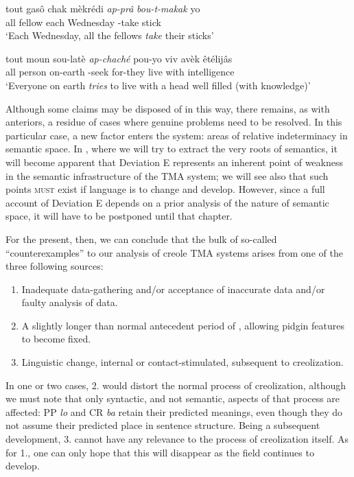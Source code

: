 \ea\label{ex:2:123}
 \gll tout gasô chak mèkrédi \emph{ap-prâ} \emph{bou-t-makak} yo\\
all fellow each Wednesday \ASP-take stick {\PL}\\
\glt `Each Wednesday, all the fellows \textit{take} their sticks'
\z

\ea\label{ex:2:124}
\gll tout moun sou-latè \emph{ap-chaché} pou-yo viv avèk êtélijâs\\
all person on-earth \ASP-seek for-they live with intelligence\\
\glt `Everyone on earth \textit{tries} to live with a head well filled (with knowledge)'
\z

Although some claims may be disposed of in this way, there remains, as with anteriors, a residue of cases where genuine problems need to be resolved. In this particular case, a new factor enters the system: areas of relative indeterminacy in semantic space. In , where we will try to extract the very roots of semantics, it will become apparent that Deviation E represents an inherent point of weakness in the semantic infrastructure of the TMA system; we will see also that such points \textsc{must} exist if language is to change and develop. However, since a full account of Deviation E depends on a prior analysis of the nature of semantic space, it will have to be postponed until that chapter.

For the present, then, we can conclude that the bulk of so-called ``counterexamples'' to our analysis of creole TMA systems arises from one of the three following sources:

\begin{enumerate}
\item Inadequate data-gathering and/or acceptance of inaccurate data and/or faulty analysis of data.
\item A slightly longer than normal antecedent period of , allowing pidgin features to become fixed.
\item Linguistic change, internal or contact-stimulated, subsequent to creolization.
\end{enumerate}
In one or two cases, 2. would distort the normal process of creolization, although we must note that only syntactic, and not semantic, aspects of that process are affected: PP \textit{lo} and CR \textit{ba} retain their predicted meanings, even though they do not assume their predicted place in sentence structure. Being a subsequent development, 3. cannot have any relevance to the process of creolization itself. As for 1., one can only hope that this will disappear as the field continues to develop.\\\\

